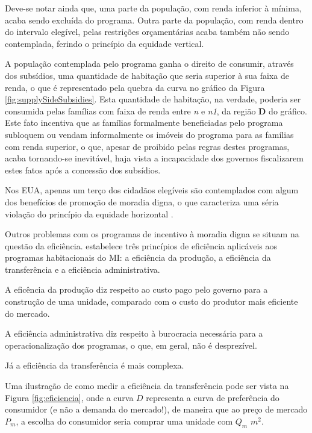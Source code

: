\documentclass[
	12pt,				%
	oneside,			%
	a4paper,			%
	chapter=TITLE,		%
	section=TITLE,		%
	english,			%
	brazil				%
	]{abntex2}
\begin{document}
\begin{refsection}
Deve-se notar ainda que, uma parte da população, com renda inferior à mínima,
acaba sendo excluída do programa. Outra parte da população, com renda dentro do
intervalo elegível, pelas restrições orçamentárias acaba também não sendo
contemplada, ferindo o princípio da equidade vertical.

A população contemplada pelo programa ganha o direito de consumir, através dos
subsídios, uma quantidade de habitação que seria superior à sua faixa de renda,
o que é representado pela quebra da curva no gráfico da Figura
\ref{fig:supplySideSubsidies}. Esta quantidade de habitação, na verdade,
poderia ser consumida pelas famílias com faixa de renda entre \emph{n} e \emph{n1}, da
região \textbf{D} do gráfico. Este fato incentiva que as famílias formalmente
beneficiadas pelo programa subloquem ou vendam informalmente os imóveis do
programa para as famílias com renda superior, o que, apesar de proibido pelas
regras destes programas, acaba tornando-se inevitável, haja vista a incapacidade
dos governos fiscalizarem estes fatos após a concessão dos subsídios.

Nos \gls{EUA}, apenas um terço dos cidadãos elegíveis são contemplados com algum
dos benefícios de promoção de moradia digna, o que caracteriza uma séria
violação do princípio da equidade horizontal \autocite{malpezzi_affordable_2018_2,malpezzi_affordable_2018_3}.

Outros problemas com os programas de incentivo à moradia digna se situam na
questão da eficiência. \textcite{malpezzi_affordable_2018_1} estabelece três princípios de
eficiência aplicáveis aos programas habitacionais do \gls{MI}: a eficiência da
produção, a eficiência da transferência e a eficiência administrativa.

A eficência da produção diz respeito ao custo pago pelo governo para a construção
de uma unidade, comparado com o custo do produtor mais eficiente do mercado.

A eficiência administrativa diz respeito à burocracia necessária para a
operacionalização dos programas, o que, em geral, não é desprezível.

Já a eficiência da transferência é mais complexa.

Uma ilustração de como medir a eficiência da transferência pode ser vista na
Figura \ref{fig:eficiencia}, onde a curva \(D\) representa a curva de preferência
do consumidor (e não a demanda do mercado!), de maneira que ao preço de mercado
\(P_m\), a escolha do consumidor seria comprar uma unidade com \(Q_m\) \(m^2\).


\end{refsection}
\end{document}
